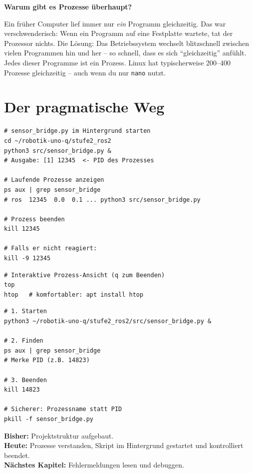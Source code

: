 \begin{haubeBox}
\textbf{Warum gibt es Prozesse überhaupt?}

Ein früher Computer lief immer nur \emph{ein} Programm gleichzeitig.
Das war verschwenderisch: Wenn ein Programm auf eine Festplatte
wartete, tat der Prozessor nichts. Die Lösung: Das Betriebssystem
wechselt blitzschnell zwischen vielen Programmen hin und her --
so schnell, dass es sich \enquote{gleichzeitig} anfühlt.
Jedes dieser Programme ist ein Prozess. Linux hat typischerweise
200--400 Prozesse gleichzeitig -- auch wenn du nur \texttt{nano} nutzt.
\end{haubeBox}

\section{Der pragmatische Weg}

\begin{lstlisting}[style=bash]
# sensor_bridge.py im Hintergrund starten
cd ~/robotik-uno-q/stufe2_ros2
python3 src/sensor_bridge.py &
# Ausgabe: [1] 12345  <- PID des Prozesses

# Laufende Prozesse anzeigen
ps aux | grep sensor_bridge
# ros  12345  0.0  0.1 ... python3 src/sensor_bridge.py

# Prozess beenden
kill 12345

# Falls er nicht reagiert:
kill -9 12345
\end{lstlisting}

\begin{lstlisting}[style=bash]
# Interaktive Prozess-Ansicht (q zum Beenden)
top
htop   # komfortabler: apt install htop
\end{lstlisting}

\begin{loesungBox}
\begin{lstlisting}[style=bash]
# 1. Starten
python3 ~/robotik-uno-q/stufe2_ros2/src/sensor_bridge.py &

# 2. Finden
ps aux | grep sensor_bridge
# Merke PID (z.B. 14823)

# 3. Beenden
kill 14823

# Sicherer: Prozessname statt PID
pkill -f sensor_bridge.py
\end{lstlisting}
\end{loesungBox}

\begin{projektBox}
\textbf{Bisher:} Projektstruktur aufgebaut.\\
\textbf{Heute:} Prozesse verstanden, Skript im Hintergrund
gestartet und kontrolliert beendet.\\
\textbf{Nächstes Kapitel:} Fehlermeldungen lesen und debuggen.
\end{projektBox}

